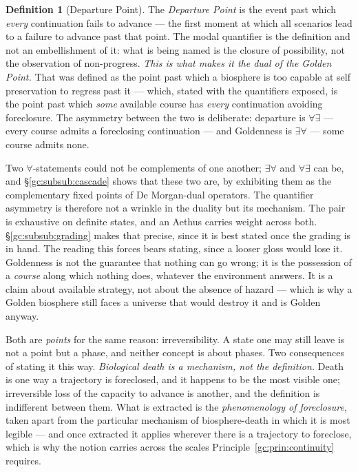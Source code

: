 \documentclass[11pt]{article}
\numberwithin{equation}{section}
\theoremstyle{plain}
\theoremstyle{definition}
\newtheorem{definition}[theorem]{Definition}
\theoremstyle{remark}
\begin{document}
\begin{definition}[Departure Point]\label{gc:def:departure}
The \emph{Departure Point} is the event past which \emph{every}
continuation fails to advance --- the first moment at which all
scenarios lead to a failure to advance past that point. The modal
quantifier is the definition and not an embellishment of it: what is
being named is the closure of possibility, not the observation of
non-progress. \emph{This is what makes it the dual of the Golden Point.} That was
defined as the point past which a biosphere is too capable at self
preservation to regress past it --- which, stated with the quantifiers
exposed, is the point past which \emph{some} available course has
\emph{every} continuation avoiding foreclosure. The asymmetry between
the two is deliberate: departure is $\forall\exists$ --- every course
admits a foreclosing continuation --- and Goldenness is
$\exists\forall$ --- some course admits none.

Two $\forall$-statements could not be complements of one another;
$\exists\forall$ and $\forall\exists$ can be, and
\S\ref{gc:subsub:cascade} shows that these two are, by exhibiting them
as the complementary fixed points of De Morgan-dual operators. The
quantifier asymmetry is therefore not a wrinkle in the duality but its
mechanism. The pair is exhaustive on definite states, and an Aethus carries weight
across both. \S\ref{gc:subsub:grading} makes that precise, since it is
best stated once the grading is in hand. The reading this forces bears stating, since a looser gloss
would lose it. Goldenness is not the guarantee that nothing can go
wrong; it is the possession of a \emph{course} along which nothing
does, whatever the environment answers. It is a claim about available
strategy, not about the absence of hazard --- which is why a Golden
biosphere still faces a universe that would destroy it and is Golden
anyway.

Both are \emph{points} for the same reason: irreversibility. A state
one may still leave is not a point but a phase, and neither concept is
about phases. Two consequences of stating it this way. \emph{Biological death is a mechanism, not the definition.} Death is one
way a trajectory is foreclosed, and it happens to be the most visible
one; irreversible loss of the capacity to advance is another, and the
definition is indifferent between them. What is extracted is the
\emph{phenomenology of foreclosure}, taken apart from the particular
mechanism of biosphere-death in which it is most legible --- and once
extracted it applies wherever there is a trajectory to foreclose,
which is why the notion carries across the scales
Principle~\ref{gc:prin:continuity} requires.


\end{definition}
\end{document}

